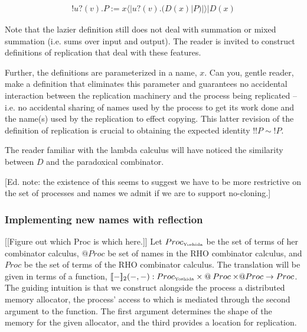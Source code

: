 \documentclass{llncs}
\makeatletter
\newcommand{\ldb}{[\![}
\newcommand{\rdb}{]\!]}
\newcommand{\lliftb}{\langle\!|}
\newcommand{\rliftb}{|\!\rangle}
\newcommand{\binpar}[2]{#1 | #2}
\newcommand{\prefix}[3]{#1?(#2) . #3}
\newcommand{\lift}[2]{#1 \lliftb #2 \rliftb}
\newcommand{\quotep}[1]{\mathsf{@}#1}
\newcommand{\bangp}[1]{! #1}
\newcommand{\meaningof}[1]{\ldb #1 \rdb}
\newcommand{\Proc}{\mathbin{Proc}}
\newcommand{\QProc}{\quotep{\mathbin{Proc}}}
\newcommand{\red}{\rightarrow}
\makeatother
\begin{document}
\begin{eqnarray}
\bangp{\prefix{u}{v}{P}} 
  := 
  \binpar{\lift{x}{\prefix{u}{v}{(\binpar{D(x)}{P})}}}{D(x)} \nonumber
\end{eqnarray}

\begin{remark}
  Note that the lazier definition still does not deal with summation
  or mixed summation (i.e. sums over input and output). The reader is
  invited to construct definitions of replication that deal with these
  features. 

  Further, the definitions are parameterized in a name, $x$. Can you,
  gentle reader, make a definition that eliminates this parameter and
  guarantees no accidental interaction between the replication
  machinery and the process being replicated -- i.e. no accidental
  sharing of names used by the process to get its work done and the
  name(s) used by the replication to effect copying. This latter
  revision of the definition of replication is crucial to obtaining
  the expected identity $!!P \sim !P$.
\end{remark}

\begin{remark}\label{rem:paradoxical_combinator}
  The reader familiar with the lambda calculus will have noticed the
  similarity between $D$ and the paradoxical combinator.

  [Ed. note: the existence of this seems to suggest we have to be more
  restrictive on the set of processes and names we admit if we are to
  support no-cloning.]
\end{remark}

\subsubsection{Implementing new names with reflection}

[[Figure out which Proc is which here.]]
Let $\Proc_{\mbox{\tiny Yoshida}}$ be the set of terms of her combinator calculus, $\QProc$ be set of names in the RHO combinator calculus, and $\Proc$ be the set of terms of the RHO combinator calculus.  The translation will be given in terms of a function, 
$\meaningof{-}_2( -, - ) : 
    \Proc_{\mbox{\tiny Yoshida}} \times \QProc {\times} \QProc \red \Proc$. 
The guiding intuition is that we construct alongside the process a distributed memory
allocator, the process' access to which is mediated through the second argument
to the function. The first argument determines the shape of the memory
for the given allocator, and the third provides a location for replication.
\end{document}
